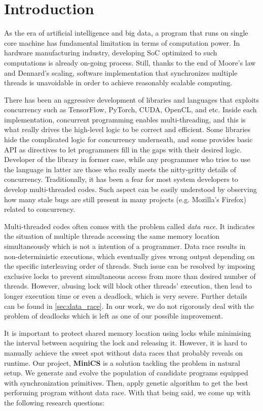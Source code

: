\section{Introduction}
\label{sec:intro}

As the era of artificial intelligence and big data, a program that runs on single core machine has fundamental limitation in terms of computation power. In hardware manufacturing industry, developing SoC optimized to such computations is already on-going process. Still, thanks to the end of Moore's law and Dennard's scaling, software implementation that synchronizes multiple threads is unavoidable in order to achieve reasonably scalable computing.

There has been an aggressive development of libraries and languages that exploits concurrency such as TensorFlow, PyTorch, CUDA, OpenCL, and etc. Inside each implementation, concurrent programming enables multi-threading, and this is what really drives the high-level logic to be correct and efficient. Some libraries hide the complicated logic for concurrency underneath, and some provides basic API as directives to let programmers fill in the gaps with their desired logic. Developer of the library in former case, while any programmer who tries to use the language in latter are those who really meets the nitty-gritty details of concurrency. Traditionally, it has been a fear for most system developers to develop multi-threaded codes. Such aspect can be easily understood by observing how many stale bugs are still present in many projects (e.g. Mozilla's Firefox) related to concurrency.

Multi-threaded codes often comes with the problem called \textit{data race}. It indicates the situation of multiple threads accessing the same memory location simultaneously which is not a intention of a programmer. Data race results in non-deterministic executions, which eventually gives wrong output depending on the specific interleaving order of threads. Such issue can be resolved by imposing exclusive locks to prevent simultaneous access from more than desired number of threads. However, abusing lock will block other threads' execution, then lead to longer execution time or even a deadlock, which is very severe. Further details can be found in \ref{sec:data_race}. In our work, we do not rigorously deal with the problem of deadlocks which is left as one of our possible improvement.

It is important to protect shared memory location using locks while minimising the interval between acquiring the lock and releasing it. However, it is hard to manually achieve the sweet spot without data races that probably reveals on runtime. Our project, \textbf{MiniCS} is a solution tackling the problem in natural setup. We generate and evolve the population of candidate programs equipped with synchronization primitives. Then, apply genetic algorithm to get the best performing program without data race. With that being said, we come up with the following research questions:

